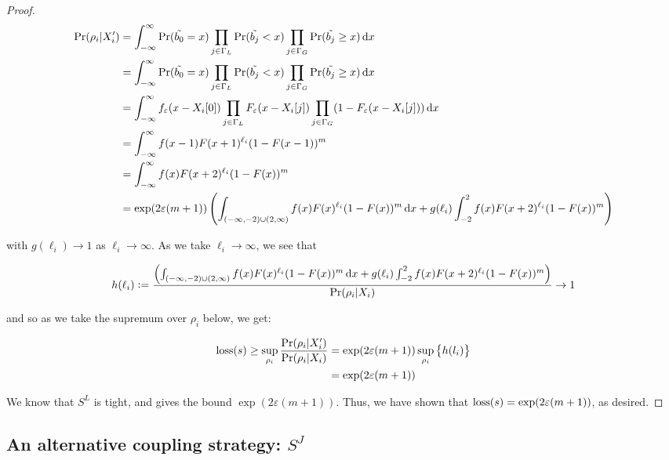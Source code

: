 \documentclass{article}
\renewcommand{\epsilon}{\varepsilon}
\newcommand{\loss}{\textup{loss}}
\newcommand{\1}{\langle 1 \rangle}
\newcommand{\2}{\langle 2 \rangle}
\begin{document}
\begin{proof}
    \begin{align*}
        \Pr(\rho_i | X_i') &= \int_{-\infty}^\infty \Pr(\tilde{b_0} = x) \prod_{j \in \Gamma_L} \Pr(\tilde{b_j} < x) \prod_{j \in \Gamma_G} \Pr(\tilde{b_j} \geq x) \dif x\\
        &= \int_{-\infty}^\infty \Pr(\tilde{b_0} = x) \prod_{j \in \Gamma_L} \Pr(\tilde{b_j} < x) \prod_{j \in \Gamma_G} \Pr(\tilde{b_j} \geq x) \dif x\\
        &= \int_{-\infty}^\infty f_\epsilon(x - X_i[0]) \prod_{j \in \Gamma_L} F_\epsilon(x - X_i[j]) \prod_{j \in \Gamma_G} (1 - F_\epsilon(x - X_i[j])) \dif x\\
        &= \int_{-\infty}^\infty f(x - 1) F(x + 1)^{\ell_i}  (1 - F(x - 1))^m \\
        &= \int_{-\infty}^\infty f(x) F(x + 2)^{\ell_i}  (1 - F(x))^m \\
        &= \exp(2\epsilon (m + 1) )\left(\int_{(-\infty, -2) \cup (2, \infty)} f(x) F(x)^{\ell_i}  (1 - F(x))^m \dif x + g(\ell_i) \int_{-2}^2 f(x) F(x + 2)^{\ell_i}  (1 - F(x))^m\right)
    \end{align*}

    with $g(\ell_i) \to 1$ as $\ell_i \to \infty$. As we take $\ell_i \to \infty$, we see that 

    \begin{align*}
        h(\ell_i) := \frac{\left(\int_{(-\infty, -2) \cup (2, \infty)} f(x) F(x)^{\ell_i}  (1 - F(x))^m \dif x + g(\ell_i) \int_{-2}^2 f(x) F(x + 2)^{\ell_i}  (1 - F(x))^m\right)}{\Pr(\rho_i | X_i)} \to 1
    \end{align*}

    and so as we take the supremum over $\rho_i$ below, we get: 

    \begin{align*}
        \loss(s) \geq \sup_{\rho_i} \frac{\Pr(\rho_i | X_i')}{\Pr(\rho_i | X_i)} &= \exp(2\epsilon(m + 1)) \sup_{\rho_i} \left\{ h(l_i) \right\}\\
        &= \exp(2\epsilon(m + 1))
    \end{align*}

    We know that $S^L$ is tight, and gives the bound $\exp(2\epsilon(m + 1))$. Thus, we have shown that $\loss(s) = \exp(2\epsilon(m + 1))$, as desired.
\end{proof}

\subsection{An alternative coupling strategy: $S^J$}
\end{document}
